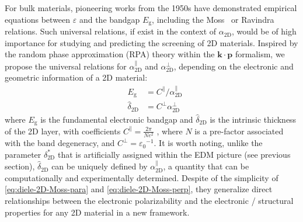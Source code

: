For bulk materials, pioneering works from the 1950s have demonstrated
empirical equations between $\varepsilon$ and the bandgap
$E_{\mathrm{g}}$, including the
Moss~\cite{Moss_1950_relation,Moss_1985_n_Eg,Finkenrath_1988_moss1} or
Ravindra~\cite{Ravindra_1980_model,Ravindra_1979_eps_Eg} relations.
Such universal relations, if exist in the context of
$\alpha_{\mathrm{2D}}$, would be of high importance for studying and
predicting the screening of 2D materials.  Inspired by the random
phase approximation (RPA) theory \cite{Adler_1962_eps} within the
$\mathbf{k} \cdot \mathbf{p}$
formalism\cite{Kittel_2005_introduction_book,Jiang_2017_Eg_Eb}, we propose
the universal relations for $\alpha_{\mathrm{2D}}^{\parallel}$ and
$\alpha_{\mathrm{2D}}^{\perp}$, depending on the electronic and
geometric information of a 2D material:
\begin{subequations}
\begin{eqnarray}
\label{eq:diele-2D-Moss-para}
  &E_{\mathrm{g}} &= C^{\parallel} / \alpha_{\mathrm{2D}}^{\parallel} \\
  \label{eq:diele-2D-Moss-perp}
  &\hat{\delta}_{\mathrm{2D}} & = C^{\perp} \alpha_{\mathrm{2D}}^{\perp} 
\end{eqnarray}
\end{subequations}
where $E_{\mathrm{g}}$ is the fundamental electronic bandgap and
$\hat{\delta}_{\mathrm{2D}}$ is the intrinsic thickness of the 2D
layer, with coefficients
$C^{\parallel} = {\displaystyle \frac{2 \pi}{Ne^2}}$
\cite{Jiang_2017_Eg_Eb}, where $N$ is a pre-factor associated with the
band degeneracy, and $C^{\perp} = {\varepsilon_{0}}^{-1}$. It is worth
noting, unlike the parameter $\delta^{*}_{\mathrm{2D}}$ that is
artificially assigned within the EDM picture (see previous section),
$\hat{\delta}_{\mathrm{2D}}$ can be uniquely defined by
$\alpha_{\mathrm{2D}}^{\parallel}$, a quantity that can be
computationally and experimentally determined. Despite of the
simplicity of  \autoref{eq:diele-2D-Moss-para} and \autoref{eq:diele-2D-Moss-perp},
they generalize direct relationships between the electronic polarizability and
the electronic / structural properties for any 2D material in a new
framework.

